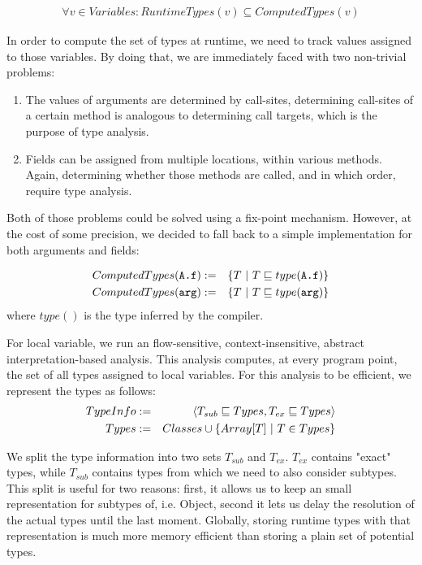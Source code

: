 \begin{eqnarray*}
    \forall v \in Variables: RuntimeTypes(v) \subseteq ComputedTypes(v)
\end{eqnarray*}

In order to compute the set of types at runtime, we need to track values
assigned to those variables. By doing that, we are immediately faced with two
non-trivial problems:
\begin{enumerate}
    \item The values of arguments are determined by call-sites, determining
    call-sites of a certain method is analogous to determining call targets,
    which is the purpose of type analysis.

    \item Fields can be assigned from multiple locations, within various
    methods. Again, determining whether those methods are
    called, and in which order, require type analysis.
\end{enumerate}

Both of those problems could be solved using a fix-point mechanism. However, at
the cost of some precision, we decided to fall back to a simple implementation
for both arguments and fields:

\begin{eqnarray*}
    ComputedTypes(\verb/A.f/) &:=& \{ T ~|~ T \subtypeeq type(\verb/A.f/) \} \\
    ComputedTypes(\verb/arg/) &:=& \{ T ~|~ T \subtypeeq type(\verb/arg/) \} \\
\end{eqnarray*}
where $type()$ is the type inferred by the compiler.

For local variable, we run an flow-sensitive, context-insensitive, abstract
interpretation-based analysis. This analysis computes, at every program point,
the set of all types assigned to local variables. For this analysis to be
efficient, we represent the types as follows:
\begin{eqnarray*}
    TypeInfo &:=& \langle T_{sub} \sqsubseteq Types, T_{ex} \sqsubseteq Types\rangle \\
    Types    &:=& Classes \cup \{ Array[T] ~|~ T \in Types \} \\
\end{eqnarray*}

We split the type information into two sets $T_{sub}$ and $T_{ex}$. $T_{ex}$
contains "exact" types, while $T_{sub}$ contains types from which we need to
also consider subtypes. This split is useful for two reasons: first, it allows
us to keep an small representation for subtypes of, i.e. Object, second it
lets us delay the resolution of the actual types until the last moment.
Globally, storing runtime types with that representation is much more memory
efficient than storing a plain set of potential types.

